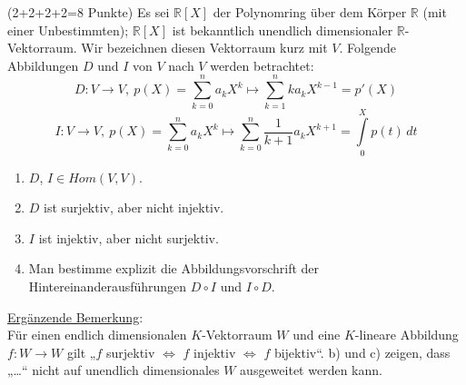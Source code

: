 \documentclass{uebblatt}
\begin{document}

\begin{aufgabe}{ (2+2+2+2=8 Punkte)}
Es sei $\mathbb{R}[X]$ der Polynomring über dem Körper $\mathbb{R}$ (mit einer Unbestimmten); $\mathbb{R}[X]$ ist bekanntlich unendlich dimensionaler $\mathbb{R}$-Vektorraum. Wir bezeichnen diesen Vektorraum kurz mit $V$. Folgende Abbildungen $D$ und $I$ von $V$ nach $V$ werden betrachtet:
$$D: V \to V, \> p(X) = \sum \limits_{k=0}^{n} a_k X^k \mapsto \sum \limits_{k=1}^{n} ka_k X^{k-1} = p'(X)$$
$$I: V \to V, \> p(X) = \sum \limits_{k=0}^{n} a_k X^k \mapsto \sum \limits_{k=0}^{n} \frac{1}{k+1} a_k X^{k+1} = \int \limits_{0}^{X}p(t) \, dt$$
\begin{enumerate}
\item $D$, $I \in Hom(V, V)$.
\item $D$ ist surjektiv, aber nicht injektiv.
\item $I$ ist injektiv, aber nicht surjektiv.
\item Man bestimme explizit die Abbildungsvorschrift der Hintereinanderausführungen $D \circ I$ und $I \circ D$.
\end{enumerate}
\underline{Ergänzende Bemerkung}:\\
Für einen endlich dimensionalen $K$-Vektorraum $W$ und eine $K$-lineare Abbildung $f : W \to W$ gilt „$f$ surjektiv $\Leftrightarrow$ $f$ injektiv $\Leftrightarrow$ $f$ bijektiv“. b) und c) zeigen, dass  „…“ nicht auf unendlich dimensionales $W$ ausgeweitet werden kann.
\end{aufgabe}
\end{document}
